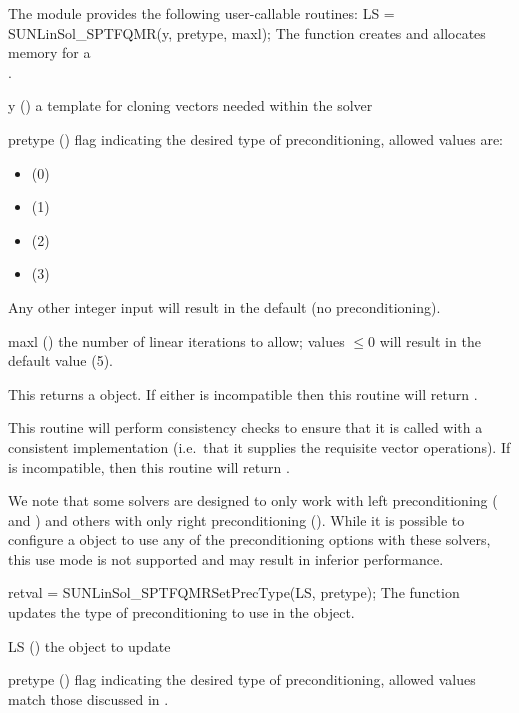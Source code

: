 The module {\sunlinsolsptfqmr} provides the following
user-callable routines:
{
  LS = SUNLinSol\_SPTFQMR(y, pretype, maxl);
}
{
  The function  creates and allocates memory for
  a {\sptfqmr} \\ \noindent {}.
}
{
  \begin{args}[pretype]
  \item[y] ()
    a template for cloning vectors needed within the solver
  \item[pretype] ()
    flag indicating the desired type of preconditioning, allowed
    values are:
    \begin{itemize}
    \item {} (0)
    \item {} (1)
    \item {} (2)
    \item {} (3)
    \end{itemize}
    Any other integer input will result in the default (no
    preconditioning).
  \item[maxl] ()
    the number of linear iterations to allow; values $\le0$ will
    result in the default value (5).
  \end{args}
}
{
  This returns a  object.  If either  is
  incompatible then this routine will return .
}
{
  This routine will perform consistency checks to ensure that it is
  called with a consistent {\nvector} implementation (i.e.~that it
  supplies the requisite vector operations).  If  is
  incompatible, then this routine will return .

  We note that some {\sundials} solvers are designed to only work
  with left preconditioning ({\ida} and {\idas}) and others with only
  right preconditioning ({\kinsol}). While it is possible to configure
  a {\sunlinsolsptfqmr} object to use any of the preconditioning options
  with these solvers, this use mode is not supported and may result in
  inferior performance.
}
{
  retval = SUNLinSol\_SPTFQMRSetPrecType(LS, pretype);
}
{
  The function  updates the type of
  preconditioning to use in the {\sunlinsolsptfqmr} object.
}
{
  \begin{args}[pretype]
  \item[LS] ()
    the {\sunlinsolsptfqmr} object to update
  \item[pretype] ()
    flag indicating the desired type of preconditioning, allowed
    values match those discussed in .
  \end{args}
}
